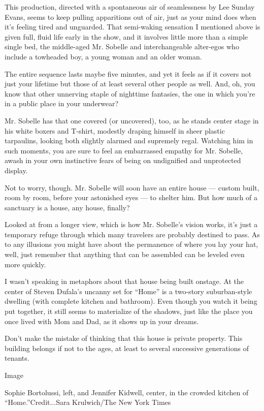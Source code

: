 This production, directed with a spontaneous air of seamlessness by Lee
Sunday Evans, seems to keep pulling apparitions out of air, just as your
mind does when it's feeling tired and unguarded. That semi-waking
sensation I mentioned above is given full, fluid life early in the show,
and it involves little more than a simple single bed, the middle-aged
Mr. Sobelle and interchangeable alter-egos who include a towheaded boy,
a young woman and an older woman.

The entire sequence lasts maybe five minutes, and yet it feels as if it
covers not just your lifetime but those of at least several other people
as well. And, oh, you know that other unnerving staple of nighttime
fantasies, the one in which you're in a public place in your underwear?

Mr. Sobelle has that one covered (or uncovered), too, as he stands
center stage in his white boxers and T-shirt, modestly draping himself
in sheer plastic tarpaulins, looking both slightly alarmed and supremely
regal. Watching him in such moments, you are sure to feel an embarrassed
empathy for Mr. Sobelle, awash in your own instinctive fears of being on
undignified and unprotected display.

Not to worry, though. Mr. Sobelle will soon have an entire house ---
custom built, room by room, before your astonished eyes --- to shelter
him. But how much of a sanctuary is a house, any house, finally?

Looked at from a longer view, which is how Mr. Sobelle's vision works,
it's just a temporary refuge through which many travelers are probably
destined to pass. As to any illusions you might have about the
permanence of where you lay your hat, well, just remember that anything
that can be assembled can be leveled even more quickly.

I wasn't speaking in metaphors about that house being built onstage. At
the center of Steven Dufala's uncanny set for ``Home'' is a two-story
suburban-style dwelling (with complete kitchen and bathroom). Even
though you watch it being put together, it still seems to materialize of
the shadows, just like the place you once lived with Mom and Dad, as it
shows up in your dreams.

Don't make the mistake of thinking that this house is private property.
This building belongs if not to the ages, at least to several successive
generations of tenants.

Image

Sophie Bortolussi, left, and Jennifer Kidwell, center, in the crowded
kitchen of ``Home.''Credit...Sara Krulwich/The New York Times

